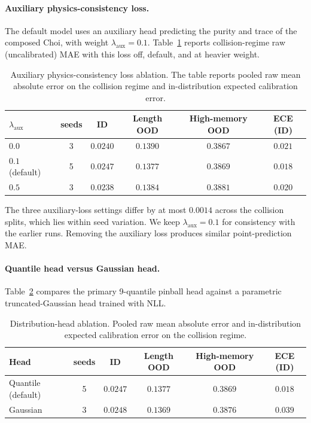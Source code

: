 \documentclass[10pt]{article}
\begin{document}
\paragraph*{Auxiliary physics-consistency loss.}
The default model uses an auxiliary head predicting the purity and trace of the composed Choi, with weight $\lambda_{\mathrm{aux}} = 0.1$. Table~\ref{tab:supp_ablation_aux} reports collision-regime raw (uncalibrated) MAE with this loss off, default, and at heavier weight.

\begin{table}[h]
\centering
\caption{Auxiliary physics-consistency loss ablation. The table reports pooled raw mean absolute error on the collision regime and in-distribution expected calibration error.}
\label{tab:supp_ablation_aux}
\begin{tabular}{lccccc}
\toprule
$\lambda_{\mathrm{aux}}$ & seeds & ID & Length OOD & High-memory OOD & ECE (ID) \\
\midrule
$0.0$ & 3 & $0.0240$ & $0.1390$ & $0.3867$ & $0.021$ \\
$0.1$ (default) & 5 & $0.0247$ & $0.1377$ & $0.3869$ & $0.018$ \\
$0.5$ & 3 & $0.0238$ & $0.1384$ & $0.3881$ & $0.020$ \\
\bottomrule
\end{tabular}
\end{table}

The three auxiliary-loss settings differ by at most $0.0014$ across the collision splits, which lies within seed variation. We keep $\lambda_{\mathrm{aux}}=0.1$ for consistency with the earlier runs. Removing the auxiliary loss produces similar point-prediction MAE.

\paragraph*{Quantile head versus Gaussian head.}
Table~\ref{tab:supp_ablation_head} compares the primary 9-quantile pinball head against a parametric truncated-Gaussian head trained with NLL.

\begin{table}[h]
\centering
\caption{Distribution-head ablation. Pooled raw mean absolute error and in-distribution expected calibration error on the collision regime.}
\label{tab:supp_ablation_head}
\begin{tabular}{lccccc}
\toprule
Head & seeds & ID & Length OOD & High-memory OOD & ECE (ID) \\
\midrule
Quantile (default) & 5 & $0.0247$ & $0.1377$ & $0.3869$ & $0.018$ \\
Gaussian & 3 & $0.0248$ & $0.1369$ & $0.3876$ & $0.039$ \\
\bottomrule
\end{tabular}
\end{table}
\end{document}
